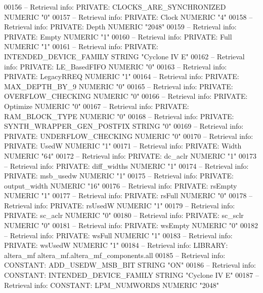 \begin{DoxyCode}
{00156 \textcolor{keyword}{-- Retrieval info: PRIVATE: CLOCKS\_ARE\_SYNCHRONIZED NUMERIC "0"}
00157 \textcolor{keyword}{-- Retrieval info: PRIVATE: Clock NUMERIC "4"}
00158 \textcolor{keyword}{-- Retrieval info: PRIVATE: Depth NUMERIC "2048"}
00159 \textcolor{keyword}{-- Retrieval info: PRIVATE: Empty NUMERIC "1"}
00160 \textcolor{keyword}{-- Retrieval info: PRIVATE: Full NUMERIC "1"}
00161 \textcolor{keyword}{-- Retrieval info: PRIVATE: INTENDED\_DEVICE\_FAMILY STRING "Cyclone IV E"}
00162 \textcolor{keyword}{-- Retrieval info: PRIVATE: LE\_BasedFIFO NUMERIC "0"}
00163 \textcolor{keyword}{-- Retrieval info: PRIVATE: LegacyRREQ NUMERIC "1"}
00164 \textcolor{keyword}{-- Retrieval info: PRIVATE: MAX\_DEPTH\_BY\_9 NUMERIC "0"}
00165 \textcolor{keyword}{-- Retrieval info: PRIVATE: OVERFLOW\_CHECKING NUMERIC "0"}
00166 \textcolor{keyword}{-- Retrieval info: PRIVATE: Optimize NUMERIC "0"}
00167 \textcolor{keyword}{-- Retrieval info: PRIVATE: RAM\_BLOCK\_TYPE NUMERIC "0"}
00168 \textcolor{keyword}{-- Retrieval info: PRIVATE: SYNTH\_WRAPPER\_GEN\_POSTFIX STRING "0"}
00169 \textcolor{keyword}{-- Retrieval info: PRIVATE: UNDERFLOW\_CHECKING NUMERIC "0"}
00170 \textcolor{keyword}{-- Retrieval info: PRIVATE: UsedW NUMERIC "1"}
00171 \textcolor{keyword}{-- Retrieval info: PRIVATE: Width NUMERIC "64"}
00172 \textcolor{keyword}{-- Retrieval info: PRIVATE: dc\_aclr NUMERIC "1"}
00173 \textcolor{keyword}{-- Retrieval info: PRIVATE: diff\_widths NUMERIC "1"}
00174 \textcolor{keyword}{-- Retrieval info: PRIVATE: msb\_usedw NUMERIC "1"}
00175 \textcolor{keyword}{-- Retrieval info: PRIVATE: output\_width NUMERIC "16"}
00176 \textcolor{keyword}{-- Retrieval info: PRIVATE: rsEmpty NUMERIC "1"}
00177 \textcolor{keyword}{-- Retrieval info: PRIVATE: rsFull NUMERIC "0"}
00178 \textcolor{keyword}{-- Retrieval info: PRIVATE: rsUsedW NUMERIC "1"}
00179 \textcolor{keyword}{-- Retrieval info: PRIVATE: sc\_aclr NUMERIC "0"}
00180 \textcolor{keyword}{-- Retrieval info: PRIVATE: sc\_sclr NUMERIC "0"}
00181 \textcolor{keyword}{-- Retrieval info: PRIVATE: wsEmpty NUMERIC "0"}
00182 \textcolor{keyword}{-- Retrieval info: PRIVATE: wsFull NUMERIC "1"}
00183 \textcolor{keyword}{-- Retrieval info: PRIVATE: wsUsedW NUMERIC "1"}
00184 \textcolor{keyword}{-- Retrieval info: LIBRARY: altera\_mf altera\_mf.altera\_mf\_components.all}
00185 \textcolor{keyword}{-- Retrieval info: CONSTANT: ADD\_USEDW\_MSB\_BIT STRING "ON"}
00186 \textcolor{keyword}{-- Retrieval info: CONSTANT: INTENDED\_DEVICE\_FAMILY STRING "Cyclone IV E"}
00187 \textcolor{keyword}{-- Retrieval info: CONSTANT: LPM\_NUMWORDS NUMERIC "2048"}
}
\end{DoxyCode}
